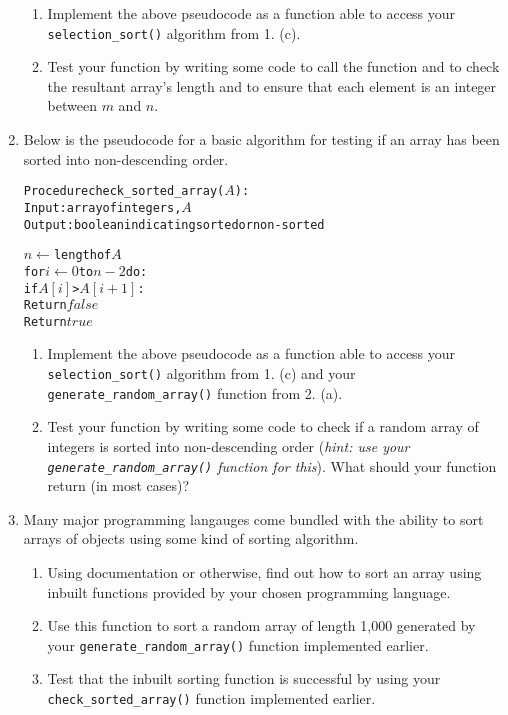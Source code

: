 \documentclass[11pt,a4paper]{report}
\begin{document}
\begin{enumerate}
    \begin{enumerate}
        \item Implement the above pseudocode as a function able to access your \texttt{selection\_sort()} algorithm from 1. (c).
        \item Test your function by writing some code to call the function and to check the resultant array's length and to ensure that each element is an integer between $m$ and $n$.
    \end{enumerate}

\item Below is the pseudocode for a basic algorithm for testing if an array has been sorted into non-descending order.
    \begin{alltt}
Procedure check_sorted_array(\(A\)):
    Input:  array of integers, \(A\)
    Output: boolean indicating sorted or non-sorted

    \(n \gets\) length of \(A\)
    for \(i \gets 0\) to \(n - 2\) do:
        if \(A[i]\) > \(A[i+1]\):
            Return \(false\)
    Return \(true\)
\end{alltt}

    \begin{enumerate}
        \item Implement the above pseudocode as a function able to access your \texttt{selection\_sort()} algorithm from 1. (c) and your \texttt{generate\_random\_array()} function from 2. (a).
        \item Test your function by writing some code to check if a random array of integers is sorted into non-descending order (\textit{hint: use your \texttt{generate\_random\_array()} function for this}). What should your function return (in most cases)?
    \end{enumerate}

\item Many major programming langauges come bundled with the ability to sort arrays of objects using some kind of sorting algorithm.
    \begin{enumerate}
        \item Using documentation or otherwise, find out how to sort an array using inbuilt functions provided by your chosen programming language.
        \item Use this function to sort a random array of length 1,000 generated by your \texttt{generate\_random\_array()} function implemented earlier.
        \item Test that the inbuilt sorting function is successful by using your \texttt{check\_sorted\_array()} function implemented earlier.
    \end{enumerate}


\end{enumerate}
\end{document}
